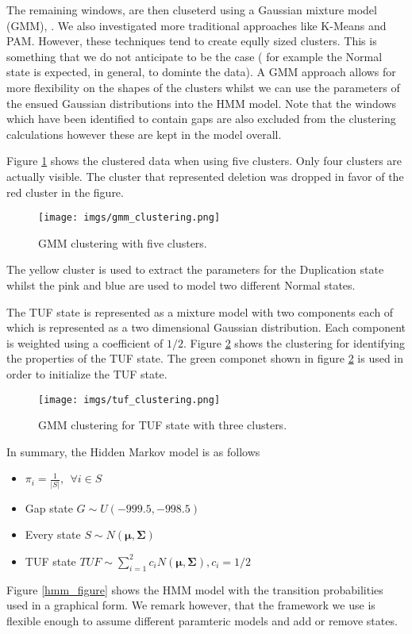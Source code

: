 The remaining windows, are then cluseterd using a Gaussian mixture model (GMM), \cite{flach2012}.  
We also investigated more traditional approaches like K-Means and PAM. However, these techniques tend to create eqully sized clusters. This is something  that we do not anticipate to be the case ( for example the Normal state is expected, in general, to dominte the data). A GMM approach allows for more flexibility on the shapes of the clusters whilst we can use the parameters of the ensued Gaussian distributions into the HMM model.
Note that the windows which have been identified to contain gaps are also excluded from the clustering calculations however these are kept in the model overall.   

Figure \ref{gmm_clustering} shows the clustered data when using five clusters. Only four clusters are actually visible. The cluster that represented deletion was dropped in favor of the  red cluster in the figure.  

\begin{figure}[!htb]
	\begin{center}
		\texttt{[image: imgs/gmm\_clustering.png]}
	\end{center}
	\caption{GMM clustering with five clusters.}
	\label{gmm_clustering}
\end{figure}  

The yellow cluster is used to extract the parameters for the Duplication state whilst the pink and blue are used to model two different Normal states.

The TUF state is represented as a mixture model with two components each of which is represented as a two dimensional Gaussian distribution. Each component is weighted using a coefficient of $1/2$.  Figure \ref{tuf_clustering} shows the clustering for identifying the properties of the TUF state. The green componet shown in figure \ref{tuf_clustering} is used in order to initialize the TUF state.


\begin{figure}[!htb]
	\begin{center}
		\texttt{[image: imgs/tuf\_clustering.png]}
	\end{center}
	\caption{GMM clustering for TUF state with three clusters.}
	\label{tuf_clustering}
\end{figure} 

In summary, the Hidden Markov model is as follows

\begin{itemize}
	\item $\pi_i = \frac{1}{|S|}, ~~ \forall i \in S$
	\item Gap state $G\sim U(-999.5, -998.5)$
	\item Every state $S \sim N(\boldsymbol{\mu}, \boldsymbol{\Sigma})$  
	\item TUF state $TUF \sim \sum_{i=1}^{2} c_i N(\boldsymbol{\mu}, \boldsymbol{\Sigma}), c_i = 1/2$
\end{itemize}
Figure \ref{hmm_figure}
shows the HMM model with the transition probabilities used in a graphical form.
We remark however, that the framework we use is flexible enough to assume different paramteric models and add or remove states.

